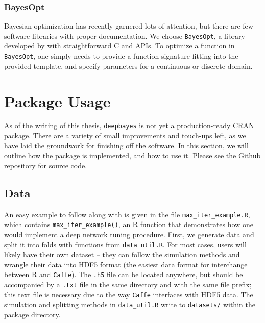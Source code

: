 \documentclass[master]{subfiles}
\begin{document}
\subsubsection{BayesOpt}
Bayesian optimization has recently garnered lots of attention, but there are few software libraries with proper documentation.  We choose \lstinline{BayesOpt}, a \CPP library developed by \cite{bayesopt} with straightforward C and \CPP APIs.  To optimize a function in \lstinline{BayesOpt}, one simply needs to provide a function signature fitting into the provided template, and specify parameters for a continuous or discrete domain.
\section{Package Usage}
As of the writing of this thesis, \lstinline{deepbayes} is not yet a production-ready CRAN package.  There are a variety of small improvements and touch-ups left, as we have laid the groundwork for finishing off the software.  In this section, we will outline how the package is implemented, and how to use it.  Please see the \href{https://github.com/edz504/thesis}{Github repository} for source code.\par
\subsection{Data}
An easy example to follow along with is given in the file \lstinline{max_iter_example.R}, which contains \lstinline{max_iter_example()}, an R function that demonstrates how one would implement a deep network tuning procedure.  First, we generate data and split it into folds with functions from \lstinline{data_util.R}.  For most cases, users will likely have their own dataset -- they can follow the simulation methods and wrangle their data into HDF5 format (the easiest data format for interchange between R and \lstinline{Caffe}).  The \lstinline{.h5} file can be located anywhere, but should be accompanied by a \lstinline{.txt} file in the same directory and with the same file prefix; this text file is necessary due to the way \lstinline{Caffe} interfaces with HDF5 data.  The simulation and splitting methods in \lstinline{data_util.R} write to \lstinline{datasets/} within the package directory.
\end{document}
